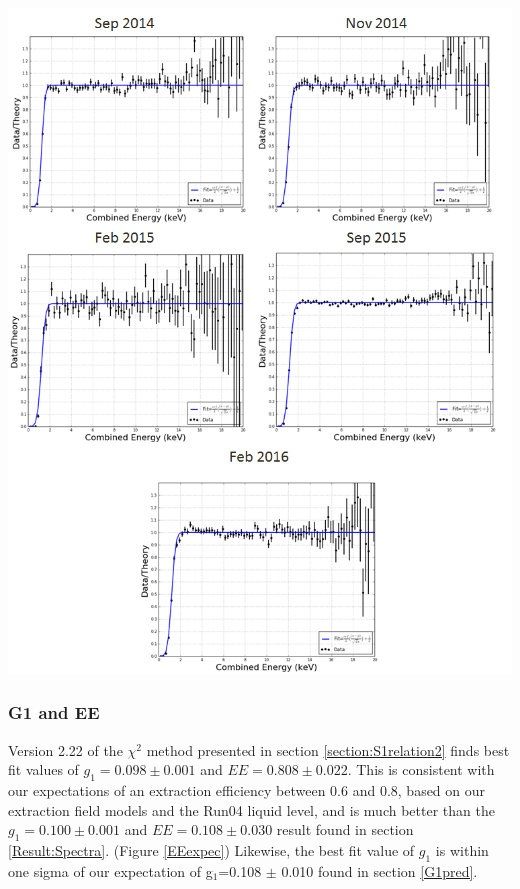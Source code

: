 \documentclass[a4paper,12pt]{article}
\begin{document}
{%

\begin{center}
\includegraphics[scale=0.7]{Run04Corrections/KrypCal_2p22_Threshold.png}
 \label{Thresholds}
\end{center}


\subsubsection{G1 and EE}

Version 2.22 of the $\chi^2$ method presented in section \ref{section:S1relation2} finds best fit values of $g_1=0.098 \pm 0.001$ and $EE=0.808 \pm 0.022$.  This is consistent with our expectations of an extraction efficiency between 0.6 and 0.8, based on our extraction field models and the Run04 liquid level, and is much better than the $g_1=0.100 \pm 0.001$ and $EE=0.108 \pm 0.030$ result found in section \ref{Result:Spectra}. (Figure \ref{EEexpec})  Likewise, the best fit value of $g_1$ is within one sigma of our expectation of g$_1$=0.108 $\pm$ 0.010 found in section \ref{G1pred}. 

}
\end{document}
